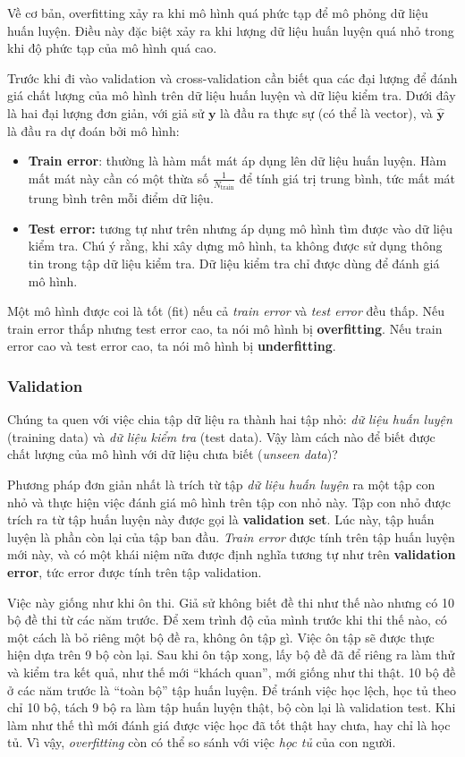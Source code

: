 \documentclass[../main-report.tex]{subfiles}
\begin{document}
Về cơ bản, overfitting xảy ra khi mô hình quá phức tạp để mô phỏng dữ liệu huấn luyện. Điều này đặc biệt xảy ra khi lượng dữ liệu huấn luyện quá nhỏ trong khi độ phức tạp của mô hình quá cao.

Trước khi đi vào validation và cross-validation cần biết qua các đại lượng để đánh giá chất lượng của mô hình trên dữ liệu huấn luyện và dữ liệu kiểm tra. Dưới đây là hai đại lượng đơn giản, với giả sử \(\mathbf{y}\) là đầu ra thực sự (có thể là vector), và \(\mathbf{\hat{y}}\) là đầu ra dự đoán bởi mô hình:

\begin{itemize}
\item \textbf{Train error}: thường là hàm mất mát áp dụng lên dữ liệu huấn luyện. Hàm mất mát này cần có một thừa số \(\frac{1}{N_{\text{train}}} \) để tính giá trị trung bình, tức mất mát trung bình trên mỗi điểm dữ liệu.
\item \textbf{Test error:} tương tự như trên nhưng áp dụng mô hình tìm được vào dữ liệu kiểm tra. Chú ý rằng, khi xây dựng mô hình, ta không được sử dụng thông tin trong tập dữ liệu kiểm tra. Dữ liệu kiểm tra chỉ được dùng để đánh giá mô hình.
\end{itemize}

Một mô hình được coi là tốt (fit) nếu cả \emph{train error} và \emph{test error} đều thấp. Nếu train error thấp nhưng test error cao, ta nói mô hình bị \textbf{overfitting}. Nếu train error cao và test error cao, ta nói mô hình bị \textbf{underfitting}.

\subsubsection*{Validation}
Chúng ta quen với việc chia tập dữ liệu ra thành hai tập nhỏ: \emph{dữ liệu huấn luyện} (training data) và \emph{dữ liệu kiểm tra} (test data). Vậy làm cách nào để biết được chất lượng của mô hình với dữ liệu chưa biết (\emph{unseen data})?

Phương pháp đơn giản nhất là trích từ tập \emph{dữ liệu huấn luyện} ra một tập con nhỏ và thực hiện việc đánh giá mô hình trên tập con nhỏ này. Tập con nhỏ được trích ra từ tập huấn luyện này được gọi là \textbf{validation set}. Lúc này, tập huấn luyện là phần còn lại của tập ban đầu. \emph{Train error} được tính trên tập huấn luyện mới này, và có một khái niệm nữa được định nghĩa tương tự như trên \textbf{validation error}, tức error được tính trên tập validation.

Việc này giống như khi ôn thi. Giả sử không biết đề thi như thế nào nhưng có 10 bộ đề thi từ các năm trước. Để xem trình độ của mình trước khi thi thế nào, có một cách là bỏ riêng một bộ đề ra, không ôn tập gì. Việc ôn tập sẽ được thực hiện dựa trên 9 bộ còn lại. Sau khi ôn tập xong, lấy bộ đề đã để riêng ra làm thử và kiểm tra kết quả, như thế mới ``khách quan'', mới giống như thi thật. 10 bộ đề ở các năm trước là ``toàn bộ'' tập huấn luyện. Để tránh việc học lệch, học tủ theo chỉ 10 bộ, tách 9 bộ ra làm tập huấn luyện thật, bộ còn lại là validation test. Khi làm như thế thì mới đánh giá được việc học đã tốt thật hay chưa, hay chỉ là học tủ. Vì vậy, \emph{overfitting} còn có thể so sánh với việc \emph{học tủ} của con người.
\end{document}
